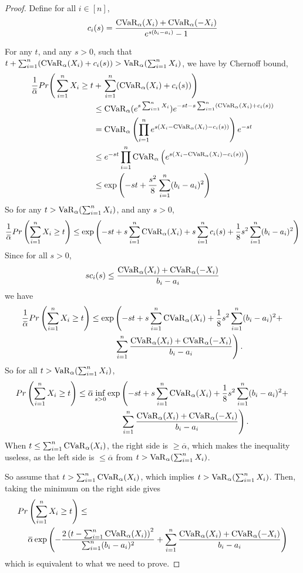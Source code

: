 \begin{proof}
	Define for all $i\in[n]$,
	$$ c_i(s) = \frac{\operatorname{CVaR}_\alpha(X_i) + \operatorname{CVaR}_\alpha(-X_i)}{e^{s(b_i - a_i)} - 1}$$
	
	For any $t$, and any $s > 0$, such that $t + \sum_{i = 1}^n (\operatorname{CVaR}_\alpha(X_i) + c_i(s)) > \operatorname{VaR}_\alpha(\sum_{i = 1}^n X_i)$, we have by Chernoff bound,
	\begin{align*}
		\frac 1 {\overbar{\alpha}} Pr\Bigg( \sumn X_i \ge t &+\left. \sumn (\Ca(X_i) + c_i(s))\right) \\
		&\le \Ca(e^{s\sumn X_i}) e^{-st - s\sumn (\Ca(X_i) + c_i(s))} \\
		&= \Ca\left(\prod_{i=1}^n e^{s(X_i - \Ca(X_i) -c_i(s))}\right)e^{-st}\\
		&\le e^{-st} \prod_{i=1}^n \Ca\left( e^{s(X_i - \Ca(X_i) -c_i(s))}\right)\\
		&\le \exp\left(-st + \frac{s^2}{8}\sumn(b_i- a_i)^2\right)
	\end{align*}
	So for any $t > \operatorname{VaR}_\alpha(\sum_{i = 1}^n X_i)$, and any $s > 0$, 
	$$
	\frac 1 {\overbar{\alpha}} Pr\left(\sumn X_i \ge t\right) 
	\le \exp\left(-st + s\sumn\Ca(X_i) + s\sumn c_i(s) + \frac 18 s^2 \sumn(b_i - a_i)^2\right)
	$$
	Since for all $s>0$, 
	$$sc_i(s) \le \frac{\operatorname{CVaR}_\alpha(X_i) + \operatorname{CVaR}_\alpha(-X_i)}{b_i - a_i}$$
	we have
	$$ \begin{aligned}
	\frac 1 {\overbar{\alpha}} Pr\left(\sumn X_i \ge t\right) 
	\le \exp&\left(-st + s\sumn\Ca(X_i) + \frac 18 s^2 \sumn(b_i - a_i)^2 + \right.\\
	& \left. \sumn \frac{\Ca(X_i) + \Ca(-X_i)}{b_i - a_i}\right).
	\end{aligned}
	$$
	So for all $t > \operatorname{VaR}_\alpha(\sum_{i = 1}^n X_i)$, 
	$$ \begin{aligned}
 	Pr\left(\sumn X_i \ge t\right) 
	\le {\overbar{\alpha}} \inf_{s > 0}\exp&\left(-st + s\sumn\Ca(X_i) + \frac 18 s^2 \sumn(b_i - a_i)^2 + \right.\\
	& \left. \sumn \frac{\Ca(X_i) + \Ca(-X_i)}{b_i - a_i}\right).
	\end{aligned}
	$$
	When $ t \le \sum_{i = 1}^n\operatorname{CVaR}_\alpha(X_i)$, the right side is $\ge {\overbar{\alpha}}$, which makes the inequality useless, as the left side is $\le {\overbar{\alpha}}$ from $t > \operatorname{VaR}_\alpha(\sum_{i = 1}^n X_i)$. 
	
	So assume that $ t > \sum_{i = 1}^n \operatorname{CVaR}_\alpha(X_i)$, which implies $ t> \operatorname{VaR}_\alpha(\sum_{i = 1}^n X_i)$. Then, taking the minimum on the right side gives 
	$$
	\begin{aligned}
	Pr &\left(\sumn X_i \ge t\right) \le \\ &{\overbar{\alpha}} \exp\left(-\frac{2\left(t - \sumn \Ca(X_i)\right)^2}{\sumn(b_i - a_i)^2} + \sumn\frac{\Ca(X_i) + \Ca(-X_i)}{b_i - a_i}\right)
	\end{aligned}
	$$
	which is equivalent to what we need to prove.
\end{proof}


